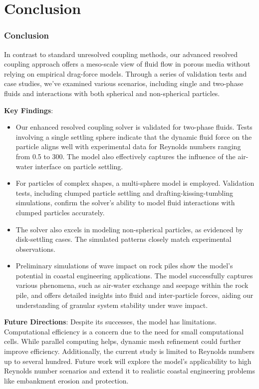 \chapter{Conclusion} \label{chap:conclusion}
\subsection{Conclusion}
In contrast to standard unresolved coupling methods, our advanced resolved coupling approach offers a meso-scale view of fluid flow in porous media without relying on empirical drag-force models. Through a series of validation tests and case studies, we've examined various scenarios, including single and two-phase fluids and interactions with both spherical and non-spherical particles.

\textbf{Key Findings}:
\begin{itemize}
    \item Our enhanced resolved coupling solver is validated for two-phase fluids. Tests involving a single settling sphere indicate that the dynamic fluid force on the particle aligns well with experimental data for Reynolds numbers ranging from 0.5 to 300. The model also effectively captures the influence of the air-water interface on particle settling.
\item For particles of complex shapes, a multi-sphere model is employed. Validation tests, including clumped particle settling and drafting-kissing-tumbling simulations, confirm the solver's ability to model fluid interactions with clumped particles accurately.
\item The solver also excels in modeling non-spherical particles, as evidenced by disk-settling cases. The simulated patterns closely match experimental observations.
\item Preliminary simulations of wave impact on rock piles show the model's potential in coastal engineering applications. The model successfully captures various phenomena, such as air-water exchange and seepage within the rock pile, and offers detailed insights into fluid and inter-particle forces, aiding our understanding of granular system stability under wave impact.
\end{itemize}

\textbf{Future Directions}:
Despite its successes, the model has limitations. Computational efficiency is a concern due to the need for small computational cells. While parallel computing helps, dynamic mesh refinement could further improve efficiency. Additionally, the current study is limited to Reynolds numbers up to several hundred. Future work will explore the model's applicability to high Reynolds number scenarios and extend it to realistic coastal engineering problems like embankment erosion and protection.